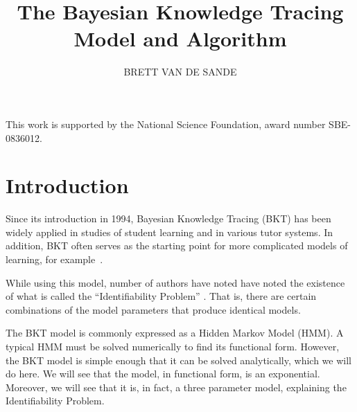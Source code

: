 \documentclass{acmlarge-edm}
\title{The Bayesian Knowledge Tracing Model and Algorithm}
\author{BRETT VAN DE SANDE
\affil{Arizona State University\\bvds@asu.edu}}
\begin{document}


\begin{bottomstuff}
This work is supported by the National Science Foundation, award
number SBE-0836012.
\end{bottomstuff}

\maketitle

%
%


\section{Introduction}

Since its introduction in 1994, Bayesian Knowledge Tracing (BKT) 
\cite{corbett_knowledge_1994} has been widely applied
in studies of student learning and in various tutor systems.  
In addition, BKT often serves as the starting
%
%
point for more complicated models of learning, for 
example~\cite{baker_r._improving_2008,lee_impact_2012}.

  
While using this model,  number of authors have noted have noted the 
existence of what is called the ``Identifiability Problem'' 
\cite{beck_identifiability:_2007}.    
That is, there are certain combinations of the model 
parameters that produce identical models.   

The BKT model is commonly expressed as a Hidden Markov Model (HMM).
A typical HMM must be solved numerically to find its functional form.
However, the BKT model is simple enough that it can be solved analytically,
which we will do here.  We will see that the model, in functional
form, is an exponential.  Moreover, we will see that it is, in fact,
a three parameter model, explaining the Identifiability Problem.

\end{document}
